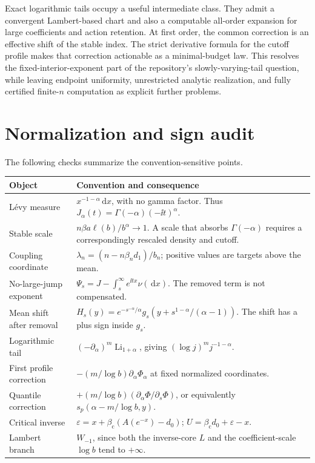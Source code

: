 \documentclass[11pt,a4paper]{article}
\numberwithin{equation}{section}
\theoremstyle{definition}\newtheorem{definition}[theorem]{Definition}
\theoremstyle{remark}\newtheorem{remark}[theorem]{Remark}
\theoremstyle{definition}
\DeclareMathOperator{\Li}{Li}
\newcommand{\bc}{\beta_{\mathrm c}}\newcommand{\rhoc}{\rho_{\mathrm c}}
\newcommand{\dd}{\,\mathrm d}
\begin{document}
Exact logarithmic tails occupy a useful intermediate class. They admit a
convergent Lambert-based chart and also a computable all-order expansion
for large coefficients and action retention. At first order, the common
correction is an effective shift of the stable index. The strict derivative
formula for the cutoff profile makes that correction actionable as a
minimal-budget law. This resolves the fixed-interior-exponent part of the
repository's slowly-varying-tail question, while leaving endpoint
uniformity, unrestricted analytic realization, and fully certified
finite-$n$ computation as explicit further problems.

\clearpage
\appendix
\section{Normalization and sign audit}
\label{app:audit}
The following checks summarize the convention-sensitive points.
\begin{longtable}{p{}p{}}
\toprule
Object & Convention and consequence\\\midrule
\endhead
L\'evy measure & $x^{-1-\alpha}\dd x$, with no gamma factor. Thus
$J_\alpha(t)=\Gamma(-\alpha)(-\ii t)^\alpha$.\\[2mm]
Stable scale & $n\beta a\ell(b)/b^\alpha\to1$. A scale that absorbs
$\Gamma(-\alpha)$ requires a correspondingly rescaled density and cutoff.\\[2mm]
Coupling coordinate & $\lambda_n=(n-n\beta_nd_1)/b_n$; positive values
are targets above the mean.\\[2mm]
No-large-jump exponent & $\Psi_s=J-\int_s^\infty e^{\ii tx}\nu(\dd x)$.
The removed term is not compensated.\\[2mm]
Mean shift after removal & $H_s(y)=e^{-s^{-\alpha}/\alpha}
 g_s(y+s^{1-\alpha}/(\alpha-1))$. The shift has a plus sign inside $g_s$.\\[2mm]
Logarithmic tail & $(-\partial_\alpha)^m\Li_{1+\alpha}$, giving
$(\log j)^m j^{-1-\alpha}$.\\[2mm]
First profile correction & $-(m/\log b)\partial_\alpha\Phi_\alpha$ at
fixed normalized coordinates.\\[2mm]
Quantile correction & $+(m/\log b)(\partial_\alpha\Phi/\partial_s\Phi)$,
or equivalently $s_p(\alpha-m/\log b,y)$.\\[2mm]
Critical inverse & $\varepsilon=x+\bc(A(e^{-x})-d_0)$;
$U=\bc d_0+\varepsilon-x$.\\[2mm]
Lambert branch & $W_{-1}$, since both the inverse-core $L$ and the
coefficient-scale $\log b$ tend to $+\infty$.\\
\bottomrule
\end{longtable}
\end{document}
